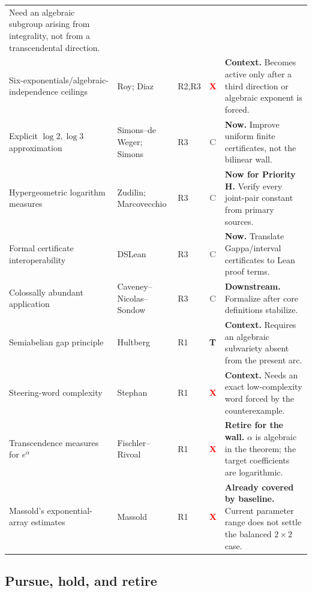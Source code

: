 \documentclass[10pt,letterpaper]{article}
\newcommand{\Rone}{\textsf{R1}}
\newcommand{\Rtwo}{\textsf{R2}}
\newcommand{\Rthree}{\textsf{R3}}
\newcommand{\badgeTemplate}{\textcolor{amber}{\textbf{T}}}
\newcommand{\badgeDiagnostic}{\textcolor{red}{\textbf{X}}}
\newcommand{\badgeCompute}{\textcolor{graytext}{\textbf{C}}}
\begin{document}
\begin{longtable}{@{}L{0.225\textwidth}L{0.275\textwidth}C{0.08\textwidth}C{0.065\textwidth}L{0.30\textwidth}@{}}
Need an algebraic subgroup arising from integrality, not from a transcendental direction.\\
\addlinespace
Six-exponentials/algebraic-independence ceilings & Roy; Diaz
\cite{RoySixExp,Diaz1989} & \Rtwo,\Rthree & \badgeDiagnostic & \textbf{Context.} Becomes active
only after a third direction or algebraic exponent is forced.\\
\addlinespace
Explicit \(\log2,\log3\) approximation & Simons--de Weger; Simons
\cite{SimonsDeWeger,Simons2005} & \Rthree & \badgeCompute & \textbf{Now.} Improve uniform
finite certificates, not the bilinear wall.\\
\addlinespace
Hypergeometric logarithm measures & Zudilin; Marcovecchio
\cite{ZudilinSurvey,Marcovecchio2009,Marcovecchio2025} & \Rthree & \badgeCompute &
\textbf{Now for Priority H.} Verify every joint-pair constant from primary sources.\\
\addlinespace
Formal certificate interoperability & DSLean \cite{DSLean2026} & \Rthree & \badgeCompute &
\textbf{Now.} Translate Gappa/interval certificates to Lean proof terms.\\
\addlinespace
Colossally abundant application & Caveney--Nicolas--Sondow
\cite{CaveneyNicolasSondow} & \Rthree & \badgeCompute & \textbf{Downstream.} Formalize after
core definitions stabilize.\\
\addlinespace
Semiabelian gap principle & Hultberg \cite{Hultberg2026} & \Rone & \badgeTemplate &
\textbf{Context.} Requires an algebraic subvariety absent from the present arc.\\
\addlinespace
Steering-word complexity & Stephan \cite{Stephan2026} & \Rone & \badgeDiagnostic &
\textbf{Context.} Needs an exact low-complexity word forced by the counterexample.\\
\addlinespace
Transcendence measures for \(e^\alpha\) & Fischler--Rivoal
\cite{FischlerRivoal2026} & \Rone & \badgeDiagnostic & \textbf{Retire for the wall.}
\(\alpha\) is algebraic in the theorem; the target coefficients are logarithmic.\\
\addlinespace
Massold's exponential-array estimates & Massold \cite{Massold2025} & \Rone &
\badgeDiagnostic & \textbf{Already covered by baseline.} Current parameter range does not
settle the balanced \(2\times2\) case.\\
\end{longtable}
\endgroup

\subsection{Pursue, hold, and retire}
\end{document}

